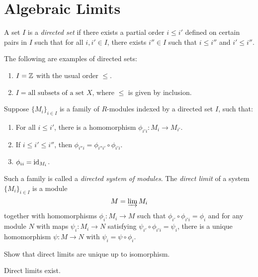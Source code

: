 \section{Algebraic Limits}

\begin{definition}
  A set $I$ is a \emph{directed set}
  if there exists a partial order
  $i \le i'$ defined on certain pairs in
  $I$ such that for all $i, i' \in I$, there
  exists $i'' \in I$ such that
  $i \le i''$ and $i' \le i''$.
\end{definition}

\begin{example}
  The following are examples of directed sets:
  \begin{enumerate}
    \item $I = \mathbb{Z}$ with the usual order $\le$.
    \item $I = \text{all subsets of a set $X$}$,
      where $\le$ is given by inclusion.
  \end{enumerate}
\end{example}

\begin{definition}
  Suppose $\{M_i\}_{i \in I}$ is a family of
  $R$-modules indexed by a directed set $I$,
  such that:
  \begin{enumerate}
    \item For all $i \le i'$, there is a
      homomorphism $\phi_{i' i} : M_i \to M_{i'}$.
    \item If $i \le i' \le i''$, then
      $\phi_{i'' i} = \phi_{i'' i'} \circ \phi_{i' i}$.
    \item $\phi_{ii} = \operatorname{id}_{M_i}$.
  \end{enumerate}
  Such a family is called a \emph{directed system of modules}.
  The \emph{direct limit} of a system
  $\{M_i\}_{i \in I}$
  is a module
  \[
    M = \varinjlim M_i
  \]
  together with
  homomorphisms $\phi_i : M_i \to M$
  such that
  $\phi_{i'} \circ \phi_{i' i} = \phi_i$
  and for any module $N$ with maps $\psi_i : M_i \to N$
  satisfying $\psi_{i'} \circ \phi_{i' i} = \psi_i$,
  there is a unique homomorphism
  $\psi : M \to N$ with
  $\psi_i = \psi \circ \phi_i$.
\end{definition}

\begin{exercise}
  Show that direct limits are unique up to
  isomorphism.
\end{exercise}

\begin{lemma}
  Direct limits exist.
\end{lemma}

